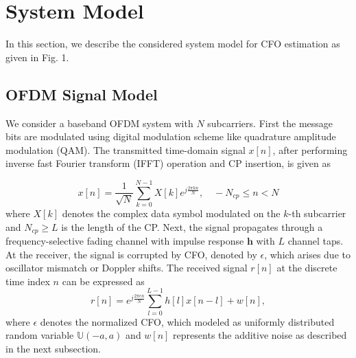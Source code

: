 \documentclass[10pt, journal]{IEEEtran}
\begin{document}
\section{System Model}
In this section, we describe the considered system model for CFO estimation as given in Fig. 1. 

\subsection{OFDM Signal Model}
We consider a baseband OFDM system with $N$ subcarriers. First the message bits are modulated using digital modulation scheme like quadrature amplitude modulation (QAM). The transmitted time-domain signal $x[n]$, after performing inverse fast Fourier transform (IFFT) operation and CP insertion, is given as

\begin{equation}
x[n] = \frac{1}{\sqrt{N}} \sum_{k=0}^{N-1} X[k] e^{j \frac{2\pi k n}{N}}, \quad -N_{cp} \le n < N
\end{equation}
\noindent where $X[k]$ denotes the complex data symbol modulated on the $k$-th subcarrier and $N_{cp}\geq L$ is the length of the CP. Next, the signal propagates through a frequency-selective fading channel with impulse response $\mathbf{h}$ with $L$ channel taps. At the receiver, the signal is corrupted by CFO, denoted by $\epsilon$, which arises due to oscillator mismatch or Doppler shifts. The received signal $r[n]$ at the discrete time index $n$ can be expressed as \cite{chaudhari2023_cad}
\begin{equation}
r[n] = e^{j\frac{2\pi \epsilon n}{N}} \sum_{l=0}^{L-1} h[l] x[n-l] + w[n],
\label{eq:rx_signal_cfo}
\end{equation}
\noindent where $\epsilon$ denotes the normalized CFO, which modeled as uniformly distributed random variable $\mathbb{U}(-a, a)$  and $w[n]$ represents the additive noise as described in the next subsection.
\end{document}
